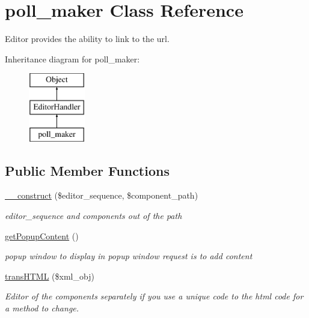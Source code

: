 \hypertarget{classpoll__maker}{\section{poll\-\_\-maker Class Reference}
\label{classpoll__maker}
}


Editor provides the ability to link to the url.  


Inheritance diagram for poll\-\_\-maker\-:\begin{figure}[H]
\begin{center}
\leavevmode
\includegraphics[height=3.000000cm]{classpoll__maker}
\end{center}
\end{figure}
\subsection*{Public Member Functions}
\begin{DoxyCompactItemize}
\item 
\hyperlink{classpoll__maker_a1bcfc02c4f6bd7a4331f2ef487f04a1b}{\-\_\-\-\_\-construct} (\$editor\-\_\-sequence, \$component\-\_\-path)
\begin{DoxyCompactList}\small\item\em editor\-\_\-sequence and components out of the path \end{DoxyCompactList}\item 
\hyperlink{classpoll__maker_aa332538c710974acc59a6209bb1f5503}{get\-Popup\-Content} ()
\begin{DoxyCompactList}\small\item\em popup window to display in popup window request is to add content \end{DoxyCompactList}\item 
\hyperlink{classpoll__maker_ac8d4b0f45f16016ad7f711123cc98ea8}{trans\-H\-T\-M\-L} (\$xml\-\_\-obj)
\begin{DoxyCompactList}\small\item\em Editor of the components separately if you use a unique code to the html code for a method to change. \end{DoxyCompactList}\end{DoxyCompactItemize}
